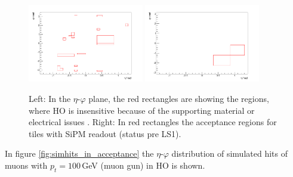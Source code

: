 			\begin{figure}[htbp]
				\centering
				\includegraphics[width=0.45\textwidth]{Figures/erdogan/deadregions.png}
				\includegraphics[width=0.45\textwidth]{Figures/erdogan/sipmregions.png}
				\caption{Left: In the $\eta$-$\varphi$ plane, the red rectangles are showing the regions, where HO is insensitive because of the supporting material or electrical issues \cite{JINST}. Right: In
				red rectangles the acceptance regions for tiles with SiPM readout (status pre LS1).}
				\label{fig:ho_acceptance}
			\end{figure}
			In figure \ref{fig:simhits_in_acceptance} the $\eta$-$\varphi$ distribution of simulated hits of muons with $p_t = 100$\,GeV (muon gun) in HO is shown.
